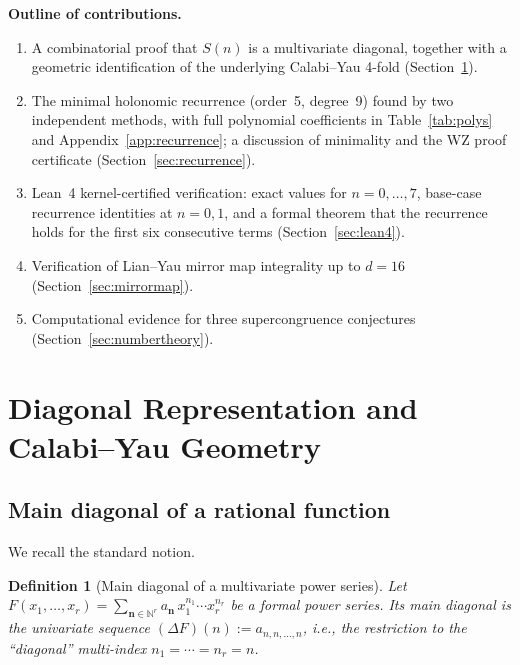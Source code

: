 \documentclass[11pt, a4paper]{article}
\newtheorem{definition}[theorem]{Definition}
\begin{document}
\medskip\noindent\textbf{Outline of contributions.}
\begin{enumerate}
    \item A combinatorial proof that $S(n)$ is a multivariate diagonal,
          together with a geometric identification of the underlying Calabi--Yau
          4-fold (Section~\ref{sec:diagonal}).
    \item The minimal holonomic recurrence (order~5, degree~9) found by two
          independent methods, with full polynomial coefficients in
          Table~\ref{tab:polys} and Appendix~\ref{app:recurrence}; a
          discussion of minimality and the WZ proof certificate
          (Section~\ref{sec:recurrence}).
    \item Lean~4 kernel-certified verification: exact values for
          $n=0,\dots,7$, base-case recurrence identities at $n=0,1$, and a
          formal theorem that the recurrence holds for the first six
          consecutive terms (Section~\ref{sec:lean4}).
    \item Verification of Lian--Yau mirror map integrality up to $d=16$
          (Section~\ref{sec:mirrormap}).
    \item Computational evidence for three supercongruence conjectures
          (Section~\ref{sec:numbertheory}).
\end{enumerate}


\section{Diagonal Representation and Calabi--Yau Geometry}%
\label{sec:diagonal}

\subsection{Main diagonal of a rational function}

We recall the standard notion.

\begin{definition}[Main diagonal of a multivariate power series]
\label{def:diagonal}
Let $F(x_1,\dots,x_r)=\sum_{\mathbf{n}\in\mathbb{N}^r}
  a_{\mathbf{n}}\,x_1^{n_1}\cdots x_r^{n_r}$ be a formal power series.
Its \emph{main diagonal} is the univariate sequence
$(\Delta F)(n) := a_{n,n,\dots,n}$, i.e., the restriction to the
``diagonal'' multi-index $n_1=\cdots=n_r=n$.
\end{definition}
\end{document}
